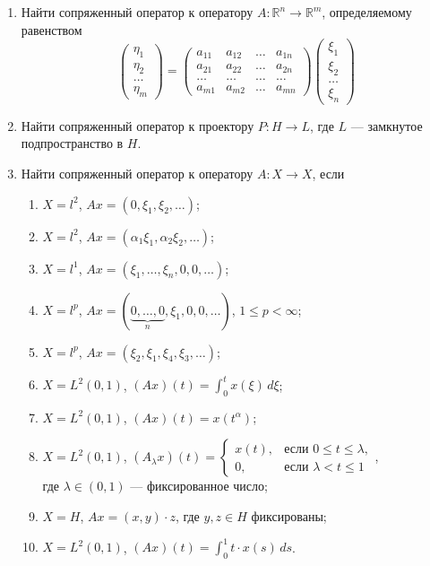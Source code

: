 \documentclass[12pt,a4paper]{article}
\begin{document}
\begin{enumerate}
\item Найти сопряженный оператор к оператору $A: \mathbb{R}^{n} \rightarrow \mathbb{R}^{m}$, определяемому равенством
$$
\begin{pmatrix} \eta_{1} \\ \eta_{2} \\ \dots \\ \eta_{m}
\end{pmatrix} =
\begin{pmatrix} a_{11} & a_{12} & \dots & a_{1n} \\ a_{21} & a_{22} & \dots & a_{2n} \\ \dots & \dots & \dots & \dots \\ a_{m1} & a_{m2} & \dots & a_{mn}
\end{pmatrix}
\begin{pmatrix} \xi_{1} \\ \xi_{2} \\ \dots \\ \xi_{n}
\end{pmatrix} $$

\item Найти сопряженный оператор к проектору $P: H \rightarrow L$, где $L$ — замкнутое подпространство в $H$.

\item Найти сопряженный оператор к оператору $A: X \rightarrow X$, если
\begin{enumerate}[label=\alph*)]
\item $X = l^{2}$, $Ax = (0, \xi_{1}, \xi_{2}, \dots)$;
\item $X = l^{2}$, $Ax = (\alpha_{1}\xi_{1}, \alpha_{2}\xi_{2}, \dots)$;
\item $X = l^{1}$, $Ax = (\xi_{1}, \dots, \xi_{n}, 0, 0, \dots)$;
\item $X = l^{p}$, $Ax = (\underbrace{0, \dots, 0}_{n}, \xi_{1}, 0, 0, \dots)$, $1 \le p < \infty$;
\item $X = l^{p}$, $Ax = (\xi_{2}, \xi_{1}, \xi_{4}, \xi_{3}, \dots)$;
\item $X = L^{2}(0,1)$, $(Ax)(t) = \int_{0}^{t} x(\xi) \, d\xi$;
\item $X = L^{2}(0,1)$, $(Ax)(t) = x(t^{\alpha})$;
\item $X = L^{2}(0,1)$, $(A_{\lambda}x)(t) =
\begin{cases} x(t), & \text{если } 0 \le t \le \lambda, \\ 0, & \text{если } \lambda < t \le 1
\end{cases}$, \\ где $\lambda \in (0,1)$ — фиксированное число;
\item $X = H$, $Ax = (x, y) \cdot z$, где $y, z \in H$ фиксированы;
\item $X = L^{2}(0,1)$, $(Ax)(t) = \int_{0}^{1} t \cdot x(s) \, ds$.
\end{enumerate}


\end{enumerate}
\end{document}

